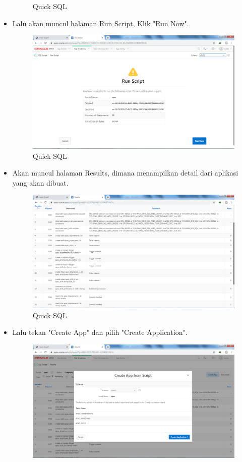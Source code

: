 \documentclass[12pt, times new roman]{article}
\begin{document}
\begin{itemize}
\begin{figure}[!htpb]
	\caption{Quick SQL}
\end{figure}
\item Lalu akan muncul halaman Run Script, Klik "Run Now".
\begin{figure}[!htpb]
	\centering
	\includegraphics[width=12cm]{figures/Screenshot_20.png}
	\caption{Quick SQL}
\end{figure}
\item Akan muncul halaman Results, dimana menampilkan detail dari aplikasi yang akan dibuat.
\begin{figure}[!htpb]
	\centering
	\includegraphics[width=12cm]{figures/Screenshot_21.png}
	\caption{Quick SQL}
\end{figure}
\item Lalu tekan "Create App" dan pilih "Create Application".
\begin{figure}[!htpb]
	\centering
	\includegraphics[width=12cm]{figures/Screenshot_22.png}

\end{figure}
\end{itemize}
\end{document}
